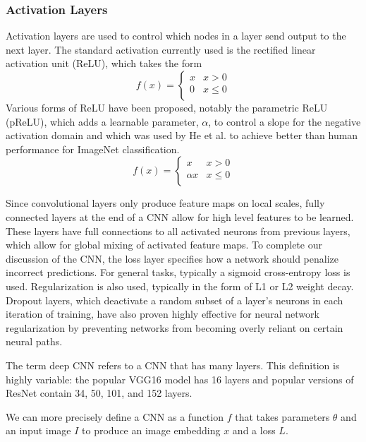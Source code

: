 \subsubsection{Activation Layers}
Activation layers are used to control which nodes in a layer send output to the next layer. The standard activation currently used is the rectified linear activation unit (ReLU), which takes the form
\begin{equation}
f(x) = \begin{cases}
x & x > 0 \\
0 & x\leq 0 \\
\end{cases}
\end{equation}
Various forms of ReLU have been proposed, notably the parametric ReLU (pReLU), which adds a learnable parameter, $\alpha$, to control a slope for the negative activation domain and which was used by He et al. to achieve better than human performance for ImageNet classification.\cite{he2016deep}
\begin{equation}
f(x) = \begin{cases}
x & x > 0 \\
\alpha x & x \leq 0 \\
\end{cases}
\end{equation}

Since convolutional layers only produce feature maps on local scales, fully connected layers at the end of a CNN allow for high level features to be learned. These layers have full connections to all activated neurons from previous layers, which allow for global mixing of activated feature maps. To complete our discussion of the CNN, the loss layer specifies how a network should penalize incorrect predictions. For general tasks, typically a sigmoid cross-entropy loss is used. Regularization is also used, typically in the form of L1 or L2 weight decay. Dropout layers, which deactivate a random subset of a layer's neurons in each iteration of training, have also proven highly effective for neural network regularization by preventing networks from becoming overly reliant on certain neural paths.\cite{srivastava2014dropout}

The term deep CNN refers to a CNN that has many layers. This definition is highly variable: the popular VGG16 model has 16 layers\cite{simonyan2014very} and popular versions of ResNet contain 34, 50, 101, and 152 layers\cite{he2016deep}.

We can more precisely define a CNN as a function $f$ that takes parameters $\theta$ and an input image $I$ to produce an image embedding $x$ and a loss $L$.

